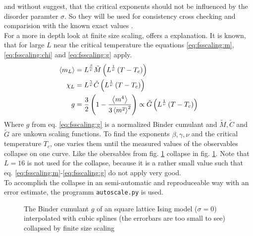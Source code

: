     \cite{Lima2000} and without \cite{Janke1994} suggest, that the
    critical exponents should not be influenced by the disorder paramter
    \(\sigma\). So they will be used for consistency cross checking and
    comparision with the known exact values \cite[S. 59]{Pelissetto2002}.\\
    For a more in depth look at finite size scaling, \cite{Norrenbrock2011}
    offers a explanation.
    It is known, that for large \(L\) near the critical temperature the
    equations \eqref{eq:fsscaling:m}, \eqref{eq:fsscaling:chi} and
    \eqref{eq:fsscaling:g} apply.
    \begin{align}
        \label{eq:fsscaling:m}
        \left< m_L \right> &= L^\frac{\beta}{\nu} \tilde{M}\left(L^\frac{1}{\nu}\left(T-T_c\right)\right)\\
        \label{eq:fsscaling:chi}
        \chi_L    &= L^\frac{\gamma}{\nu} \tilde{C}\left(L^\frac{1}{\nu}\left(T-T_c\right)\right)\\
        \label{eq:fsscaling:g}
        g          &= \frac{3}{2}\left(1-\frac{\left< m^4 \right>}{3\left< m^2 \right>^2}\right) \propto \tilde{G}\left(L^\frac{1}{\nu}\left(T-T_c\right)\right)
    \end{align}
    Where \(g\) from eq. \eqref{eq:fsscaling:g} is a normalized
    Binder cumulant \cite{Binder1981} and \(\tilde{M}, \tilde{C}\) and \(\tilde{G}\)
    are unkown scaling functions. To find the exponents
    \(\beta, \gamma, \nu\) and the critical temperature \(T_c\), one
    varies them until the measured values of the observables collapse on
    one curve. Like the obersables from fig. \ref{fig:gettingCrit}
    collapse in fig. \ref{fig:gettingCrit}.
    Note that \(L=16\) is not used for the collapse, because it is a
    rather small value such that eq. \eqref{eq:fsscaling:m}-\eqref{eq:fsscaling:g}
    do not apply very good.\\
    To accomplish the collapse in an semi-automatic and reproduceable
    way with an error estimate, the programm
    \texttt{autoscale.py} \cite{autoscale2009} is used.
    \begin{figure}[htbp]
        \centering
        \caption[Examples of determining critical temperature and exponents]
        {
            The Binder cumulant \(g\) of an square lattice Ising model
            (\(\sigma=0\))\\
             interpolated
                with cubic splines (the errorbars are too small to see)\\
             collapsed by finite
                size scaling
        }
        \label{fig:gettingCrit}
    \end{figure}\\
